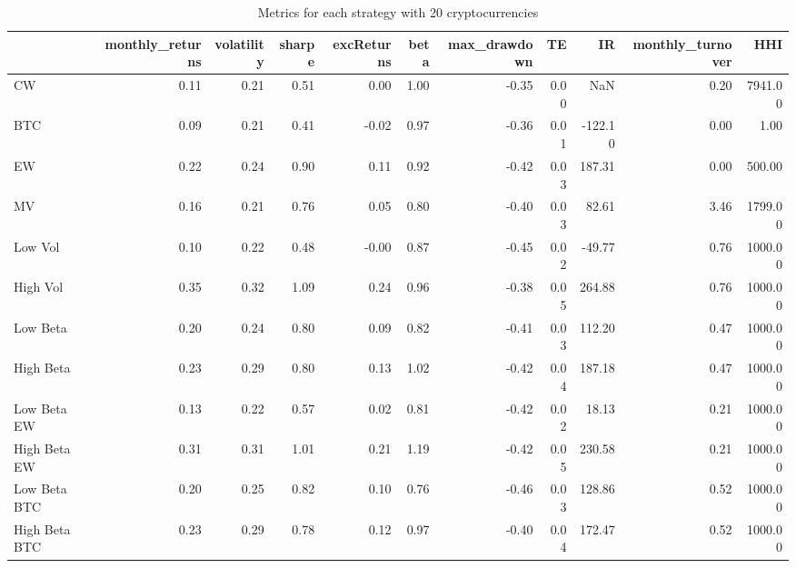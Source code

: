 \begin{table}
\centering
\caption{Metrics for each strategy with 20 cryptocurrencies}
\label{metrics20}
\begin{tabular}{lrrrrrrrrrr}
\toprule
{} &  monthly\_returns &  volatility &  sharpe &  excReturns &  beta &  max\_drawdown &   TE &      IR &  monthly\_turnover &     HHI \\
\midrule
CW            &             0.11 &        0.21 &    0.51 &        0.00 &  1.00 &         -0.35 & 0.00 &     NaN &              0.20 & 7941.00 \\
BTC           &             0.09 &        0.21 &    0.41 &       -0.02 &  0.97 &         -0.36 & 0.01 & -122.10 &              0.00 &    1.00 \\
EW            &             0.22 &        0.24 &    0.90 &        0.11 &  0.92 &         -0.42 & 0.03 &  187.31 &              0.00 &  500.00 \\
MV            &             0.16 &        0.21 &    0.76 &        0.05 &  0.80 &         -0.40 & 0.03 &   82.61 &              3.46 & 1799.00 \\
Low Vol       &             0.10 &        0.22 &    0.48 &       -0.00 &  0.87 &         -0.45 & 0.02 &  -49.77 &              0.76 & 1000.00 \\
High Vol      &             0.35 &        0.32 &    1.09 &        0.24 &  0.96 &         -0.38 & 0.05 &  264.88 &              0.76 & 1000.00 \\
Low Beta      &             0.20 &        0.24 &    0.80 &        0.09 &  0.82 &         -0.41 & 0.03 &  112.20 &              0.47 & 1000.00 \\
High Beta     &             0.23 &        0.29 &    0.80 &        0.13 &  1.02 &         -0.42 & 0.04 &  187.18 &              0.47 & 1000.00 \\
Low Beta EW   &             0.13 &        0.22 &    0.57 &        0.02 &  0.81 &         -0.42 & 0.02 &   18.13 &              0.21 & 1000.00 \\
High Beta EW  &             0.31 &        0.31 &    1.01 &        0.21 &  1.19 &         -0.42 & 0.05 &  230.58 &              0.21 & 1000.00 \\
Low Beta BTC  &             0.20 &        0.25 &    0.82 &        0.10 &  0.76 &         -0.46 & 0.03 &  128.86 &              0.52 & 1000.00 \\
High Beta BTC &             0.23 &        0.29 &    0.78 &        0.12 &  0.97 &         -0.40 & 0.04 &  172.47 &              0.52 & 1000.00 \\
\bottomrule
\end{tabular}
\end{table}
